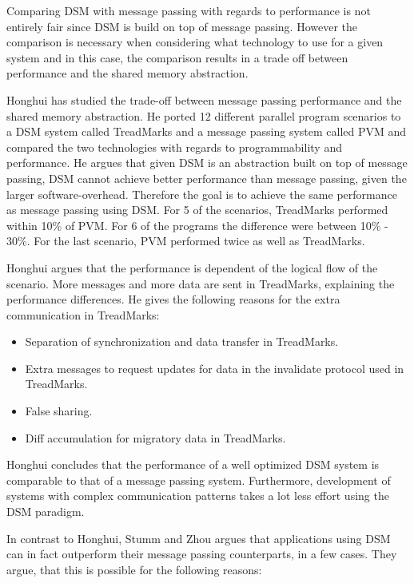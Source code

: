Comparing DSM with message passing with regards to performance is not entirely fair since DSM is build on top of message passing. However the comparison is necessary when considering what technology to use for a given system and in this case, the comparison results in a trade off between performance and the shared memory abstraction. 

Honghui \cite{lu1995message} has studied the trade-off between message passing performance and the shared memory abstraction. He ported 12 different parallel program scenarios to a DSM system called TreadMarks and a message passing system called PVM and compared the two technologies with regards to programmability and performance. He argues that given DSM is an abstraction built on top of message passing, DSM cannot achieve better performance than message passing, given the larger software-overhead. Therefore the goal is to achieve the same performance as message passing using DSM. For 5 of the scenarios, TreadMarks performed within 10\% of PVM. For 6 of the programs the difference were between 10\% - 30\%. For the last scenario, PVM performed twice as well as TreadMarks. 

Honghui argues that the performance is dependent of the logical flow of the scenario. More messages and more data are sent in TreadMarks, explaining the performance differences. He gives the following reasons for the extra communication in TreadMarks:

\begin{itemize}
	\item Separation of synchronization and data transfer in TreadMarks. 
	\item Extra messages to request updates for data in the invalidate protocol used in TreadMarks.
	\item False sharing.
	\item Diff accumulation for migratory data in TreadMarks.
\end{itemize} 

Honghui concludes that the performance of a well optimized DSM system is comparable to that of a message passing system. Furthermore, development of systems with complex communication patterns takes a lot less effort using the DSM paradigm.

In contrast to Honghui, Stumm and Zhou \cite{stumm1990algorithms} argues that applications using DSM can in fact outperform their message passing counterparts, in a few cases. They argue, that this is possible for the following reasons:

